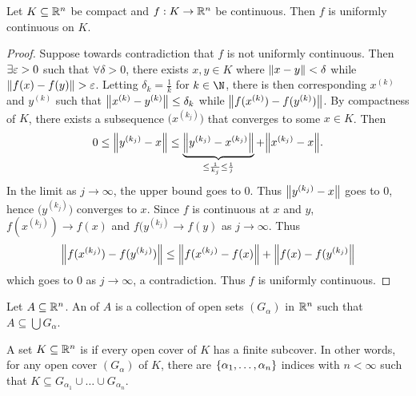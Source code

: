 \documentclass[../main.tex]{subfiles}
\begin{document}
\begin{theorem}
    Let $K \subseteq \mathbb{R}^n$ be compact and $f : K \to \mathbb{R}^n$ be continuous. Then $f$ is uniformly continuous on $K$.
\end{theorem}

\begin{proof}
    Suppose towards contradiction that $f$ is not uniformly continuous. Then $\exists \varepsilon > 0$ such that $\forall \delta > 0$, there exists $x,y \in K$ where $\norm{x - y} < \delta$ while $\norm{f(x) - f(y)} > \varepsilon$. Letting $\delta_k = \frac{1}{k}$ for $k \in \N$, there is then corresponding $x^{(k)}$ and $y^{(k)}$ such that $\norm{x^{(k)} - y^{(k)}} \leq \delta_k$ while $\norm{f(x^{(k)}) - f(y^{(k)})}$. By compactness of $K$, there exists a subsequence $\bigl(x^{(k_j)}\bigr)$ that converges to some $x \in K$. Then
    \[
        0 \leq \norm{y^{(k_j)} - x} \leq \underbrace{\norm{y^{(k_j)} - x^{(k_j)}}}_{\leq \frac{1}{k_j} \leq \frac{1}{j}} + \norm{x^{(k_j)} - x}
    .\]
    In the limit as $j \to \infty$, the upper bound goes to $0$. Thus $\norm{y^{(k_j)} - x}$ goes to $0$, hence $\bigl(y^{(k_j)}\bigr)$ converges to $x$. Since $f$ is continuous at $x$ and $y$, $f(x^{(k_j)}) \to f(x)$ and $f(y^{(k_j)} \to f(y)$ as $j \to \infty$. Thus
    \[
        \norm{f(x^{(k_j)}) - f(y^{(k_j)})} \leq \norm{f(x^{(k_j)} - f(x)} + \norm{f(x) - f(y^{(k_j)}}
    \]
    which goes to $0$ as $j \to \infty$, a contradiction. Thus $f$ is uniformly continuous.
\end{proof}

\begin{definition}
    Let $A \subseteq \mathbb{R}^n$. An  of $A$ is a collection of open sets $(G_{\alpha})$ in $\mathbb{R}^n$ such that $A \subseteq \bigcup G_{\alpha}$.
\end{definition}

\begin{definition}
    A set $K \subseteq \mathbb{R}^n$ is  if every open cover of $K$ has a finite subcover. In other words, for any open cover $(G_{\alpha})$ of $K$, there are $\qty{\alpha_1, \ldots, \alpha_n}$ indices with $n < \infty$ such that $K \subseteq G_{\alpha_1} \cup \ldots \cup G_{\alpha_n}$.
\end{definition}
\end{document}
